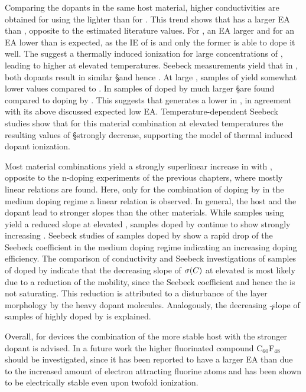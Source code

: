 Comparing the dopants in the same host material, higher conductivities are obtained for using the lighter \FS than for \CSF. This trend shows that \FS has a larger EA than \CSF, opposite to the estimated literature values\cite{Tietze2012,Meerheim2011}. For \FS, an EA larger and for \CSF an EA lower than  is expected, as the IE of \lili is  and only the former is able to dope it well.
The \EactLongs suggest a thermally induced ionization for large concentrations of \CSF, leading to higher \nhLong at elevated temperatures.
Seebeck measurements yield that in \meo, both dopants result in similar \S and hence \Es. At large \C, samples of \FS yield somewhat lower values compared to \CSF. In samples of \lili doped by \CSF much larger \S are found compared to doping by \FS. This suggests that \CSF generates a lower \nhLong in \lili, in agreement with its above discussed expected low EA. Temperature-dependent Seebeck studies show that for this material combination at elevated temperatures the resulting values of \S strongly decrease, supporting the model of thermal induced dopant ionization.

Most material combinations yield a strongly superlinear increase in \cLong with \CLong, opposite to the n-doping experiments of the previous chapters, where mostly linear relations are found.
Here, only for the combination of doping \meo by \CSF in the medium doping regime a linear relation is observed. In general, the host \lili and the dopant \FS lead to stronger slopes than the other materials.
%
While samples using \CSF yield a reduced slope at elevated \CLongs, samples doped by \FS continue to show strongly increasing \cLongs. Seebeck studies of samples doped by \FS show a rapid drop of the Seebeck coefficient in the medium doping regime indicating an increasing doping efficiency.
%
The comparison of conductivity and Seebeck investigations of samples of \meo doped by \CSF indicate that the decreasing slope of $\c(\C)$ at elevated \C is most likely due to a reduction of the mobility, since the Seebeck coefficient and hence the \nhLong is not saturating. This reduction is attributed to a disturbance of the layer morphology by the heavy dopant molecules. Analogously, the decreasing \c-slope of samples of \lili highly doped by \CSF is explained.

Overall, for devices the combination of the more stable host \lili with the stronger dopant \FS is advised.
In a future work the higher fluorinated compound C$_{60}$F$_{48}$ should be investigated, since it has been reported to have a larger EA than \CSF\cite{Liu1997} due to the increased amount of electron attracting fluorine atoms and has been shown to be electrically stable even upon twofold ionization\cite{Jin1994}.

